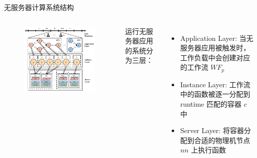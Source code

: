 \documentclass[aspectratio=169]{beamer}
\begin{document}
\begin{frame}{无服务器计算系统结构}
  \begin{columns}
    \begin{figure}
      \centering
      \includegraphics[width=\textwidth]{img/serverless-system-architecture/system-model.pdf}
    \end{figure}

    运行无服务器应用的系统分为三层：
    \begin{itemize}
      \item Application Layer: 当无服务器应用被触发时，工作负载中会创建对应的工作流 $WF_p$
      \item Instance Layer: 工作流中的函数被逐一分配到 runtime 匹配的容器 $c$ 中
      \item Server Layer: 将容器分配到合适的物理机节点 $nn$ 上执行函数
    \end{itemize}
  \end{columns}
\end{frame}
\end{document}
